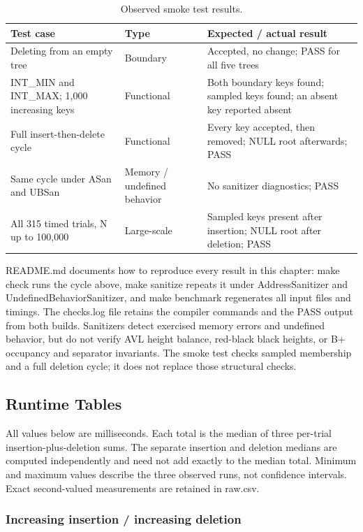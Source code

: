 \begin{table}[H]
\centering
\small
\caption{Observed smoke test results.}
\begin{tabularx}{\textwidth}{XlX}
\toprule
Test case & Type & Expected / actual result \\
\midrule
Deleting from an empty tree & Boundary & Accepted, no change; PASS for all five trees \\
INT\_MIN and INT\_MAX; 1,000 increasing keys & Functional & Both boundary keys found; sampled keys found; an absent key reported absent \\
Full insert-then-delete cycle & Functional & Every key accepted, then removed; NULL root afterwards; PASS \\
Same cycle under ASan and UBSan & Memory / undefined behavior & No sanitizer diagnostics; PASS \\
All 315 timed trials, N up to 100,000 & Large-scale & Sampled keys present after insertion; NULL root after deletion; PASS \\
\bottomrule
\end{tabularx}
\end{table}
\FloatBarrier

README.md documents how to reproduce every result in this chapter: make check runs the cycle above, make sanitize repeats it under AddressSanitizer and UndefinedBehaviorSanitizer, and make benchmark regenerates all input files and timings. The checks.log file retains the compiler commands and the PASS output from both builds. Sanitizers detect exercised memory errors and undefined behavior, but do not verify AVL height balance, red-black black heights, or B+ occupancy and separator invariants. The smoke test checks sampled membership and a full deletion cycle; it does not replace those structural checks.

\subsection{Runtime Tables}

All values below are milliseconds. Each total is the median of three per-trial insertion-plus-deletion sums. The separate insertion and deletion medians are computed independently and need not add exactly to the median total. Minimum and maximum values describe the three observed runs, not confidence intervals. Exact second-valued measurements are retained in raw.csv.

\subsubsection{Increasing insertion / increasing deletion}


